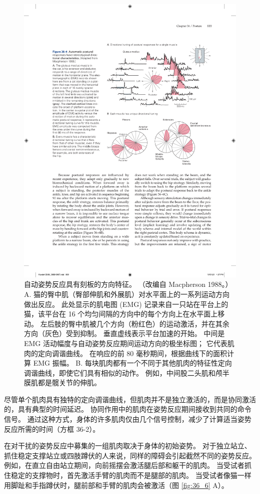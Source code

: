 \begin{figure}[htbp]
	\centering
	\includegraphics[width=0.7\linewidth]{chap36/fig_36_4}
	\caption{自动姿势反应具有刻板的方向特征。 （改编自 Macpherson 1988。） 
		A. 猫的臀中肌（臀部伸肌和外展肌）对水平面上的一系列运动方向做出反应。 
		此处显示的肌电图 (EMG) 记录来自一只站在平台上的猫，该平台在 16 个均匀间隔的方向中的每个方向上在水平面上移动。 
		左后肢的臀中肌被几个方向（粉红色）的运动激活，并在其余方向（灰色）受到抑制。 
		垂直虚线表示平台加速的开始。 
		中间是 EMG 活动幅度与自动姿势反应期间运动方向的极坐标图； 它代表肌肉的定向调谐曲线。 在响应的前 80 毫秒期间，根据曲线下的面积计算 EMG 振幅。 
		B. 每块肌肉都有一个不同于其他肌肉的特征性定向调谐曲线，即使它们具有相似的动作。 例如，中间股二头肌和颅半膜肌都是髋关节的伸肌。}
	\label{fig:36_4}
\end{figure}


尽管单个肌肉具有独特的定向调谐曲线，但肌肉并不是独立激活的，而是协同激活的，具有典型的时间延迟。 协同作用中的肌肉在姿势反应期间接收到共同的命令信号。 通过这种方式，身体的许多肌肉仅由几个信号控制，减少了计算适当姿势反应所需的时间（方框 36-2）。

在对干扰的姿势反应中募集的一组肌肉取决于身体的初始姿势。 对于独立站立、抓住稳定支撑站立或四肢蹲伏的人来说，同样的障碍会引起截然不同的姿势反应。 例如，在直立自由站立期间，向前摇摆会激活腿后部和躯干的肌肉。 当受试者抓住稳定的支撑物时，首先激活手臂的肌肉而不是腿部的肌肉。 
当受试者像猫一样用脚趾和手指蹲伏时，腿前部和手臂的肌肉会被激活（图 \ref{fig:36_6} A）。

